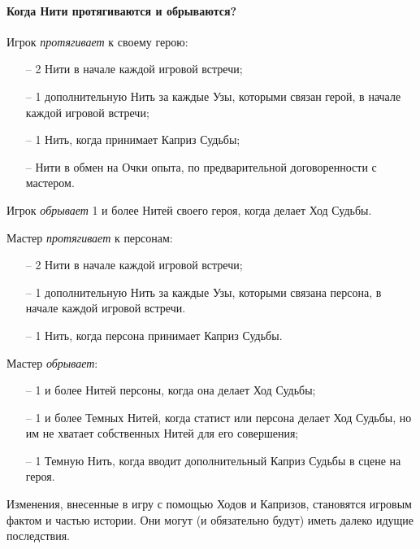 \paragraph{Когда Нити протягиваются и обрываются?}
Игрок \textit{протягивает} к своему герою:
\begin{itemize}
    \item[--] 2 Нити в начале каждой игровой встречи;
    \item[--] 1 дополнительную Нить за каждые Узы, которыми связан герой, в начале каждой игровой встречи;
    \item[--] 1 Нить, когда принимает Каприз Судьбы;
    \item[--] Нити в обмен на Очки опыта, по предварительной договоренности с мастером.
\end{itemize}
Игрок \textit{обрывает} 1 и более Нитей своего героя, когда делает Ход Судьбы.


Мастер \textit{протягивает} к персонам:
\begin{itemize}
    \item[--] 2 Нити в начале каждой игровой встречи;
    \item[--] 1 дополнительную Нить за каждые Узы, которыми связана персона, в начале каждой игровой встречи.
    \item[--] 1 Нить, когда персона принимает Каприз Судьбы.
\end{itemize}
Мастер \textit{обрывает}:
\begin{itemize}
    \item[--] 1 и более Нитей персоны, когда она делает Ход Судьбы;
    \item[--] 1 и более Темных Нитей, когда статист или персона делает Ход Судьбы, но им не хватает собственных Нитей для его совершения;
    \item[--] 1 Темную Нить, когда вводит дополнительный Каприз Судьбы в сцене на героя.
\end{itemize}

\begin{tcolorbox}
Изменения, внесенные в игру с помощью Ходов и Капризов, становятся игровым фактом и частью истории. Они могут (и обязательно будут) иметь далеко идущие последствия.
\end{tcolorbox}

